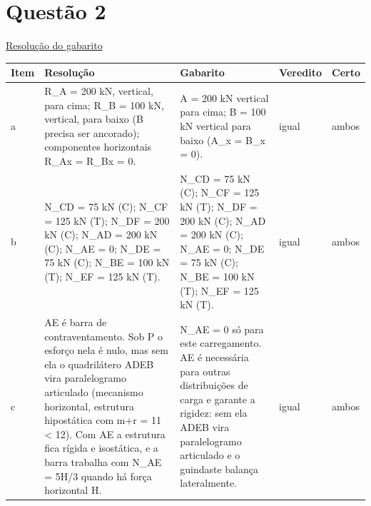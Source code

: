 \documentclass{article}%
\begin{document}
\section*{Questão 2}%
\href{https://poliedroresolve.sistemapoliedro.com.br/vestibulares/ime/2027/ime-2-fase-dia-2-27-10-2026-2-fase-dia-2/dissertativa-2-fisica-2-fase-dia-2-ime-2027}{Resolução do gabarito}\par\smallskip%
\begin{longtable}{@{}p{} p{} p{} p{} p{}@{}}\toprule Item & Resolução & Gabarito & Veredito & Certo \\ \midrule
a & R\_A = 200 kN, vertical, para cima; R\_B = 100 kN, vertical, para baixo (B precisa ser ancorado); componentes horizontais R\_Ax = R\_Bx = 0. & A = 200 kN vertical para cima; B = 100 kN vertical para baixo (A\_x = B\_x = 0). & igual & ambos \\
b & N\_CD = 75 kN (C); N\_CF = 125 kN (T); N\_DF = 200 kN (C); N\_AD = 200 kN (C); N\_AE = 0; N\_DE = 75 kN (C); N\_BE = 100 kN (T); N\_EF = 125 kN (T). & N\_CD = 75 kN (C); N\_CF = 125 kN (T); N\_DF = 200 kN (C); N\_AD = 200 kN (C); N\_AE = 0; N\_DE = 75 kN (C); N\_BE = 100 kN (T); N\_EF = 125 kN (T). & igual & ambos \\
c & AE é barra de contraventamento. Sob P o esforço nela é nulo, mas sem ela o quadrilátero ADEB vira paralelogramo articulado (mecanismo horizontal, estrutura hipostática com m+r = 11 < 12). Com AE a estrutura fica rígida e isostática, e a barra trabalha com N\_AE = 5H/3 quando há força horizontal H. & N\_AE = 0 só para este carregamento. AE é necessária para outras distribuições de carga e garante a rigidez: sem ela ADEB vira paralelogramo articulado e o guindaste balança lateralmente. & igual & ambos \\
\bottomrule\end{longtable}%
\end{document}

